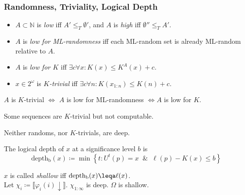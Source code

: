 \documentclass[UTF8,11pt,colorlinks,compress,openany]{beamer}%
\begin{document}
\begin{frame}\frametitle{Randomness, Triviality, Logical Depth}
\setlength\abovedisplayskip{0pt}
\setlength\belowdisplayskip{0pt}
\begin{itemize}
\item $A\subset\mathbb{N}$ is \emph{low} iff $A'\leq_T\emptyset'$, and $A$ is \emph{high} iff $\emptyset''\leq_T A'$.
\item $A$ is \emph{low for ML-randomness} iff each ML-random set is already ML-random relative to $A$.
\item $A$ is \emph{low for $K$} iff $\exists c\forall x: K(x)\leq K^A(x)+c$.
\item $x\in 2^\omega$ is \emph{$K$-trivial} iff $\exists c\forall n: K(x_{1:n})\leq K(n)+c$.
\end{itemize}
\begin{theorem}
$A$ is $K$-trivial $\iff$ $A$ is low for ML-randomness $\iff A$ is low for $K$.
\end{theorem}
Some sequences are $K$-trivial but not computable.

Neither randoms, nor $K$-trivials, are deep.
\begin{definition}
The logical depth of $x$ at a significance level $b$ is
\[\operatorname{depth_b}(x)\coloneqq \min\left\{t: U^t(p)=x\;\;\&\;\;\ell(p)-K(x)\leq b\right\}\]
\end{definition}
$x$ is called \emph{shallow} iff $\operatorname{depth_b}(x)\leqa\ell(x)$.\\
Let $\chi_i\coloneqq \llbracket\varphi_i(i)\downarrow\rrbracket$. $\chi_{1:\infty}$ is deep. $\Omega$ is shallow.
\end{frame}
\end{document}
